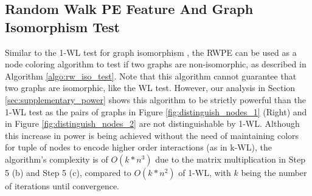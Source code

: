 \documentclass{article} \usepackage{iclr2021_conference,times}
\begin{document}
\subsection{Random Walk PE Feature And Graph Isomorphism Test}
\label{sec:supplementary_algo}


Similar to the 1-WL test for graph isomorphism \citep{weisfeiler1968reduction, morris2019weisfeiler, sato2020survey}, the RWPE can be used as a node coloring algorithm to test if two graphs are non-isomorphic, as described in Algorithm \ref{algo:rw_iso_test}. Note that this algorithm cannot guarantee that two graphs are isomorphic, like the WL test. However, our analysis in Section \ref{sec:supplementary_power} shows this algorithm to be strictly powerful than the 1-WL test as the pairs of graphs in Figure \ref{fig:distinguish_nodes_1} (Right) and in Figure \ref{fig:distinguish_nodes_2} are not distinguishable by 1-WL. Although this increase in power is being achieved without the need of maintaining colors for tuple of nodes to encode higher order interactions (as in k-WL), the algorithm's complexity is of $O(k * n^3)$ due to the matrix multiplication in Step 5 (b) and Step 5 (c), compared to $O(k * n^2)$ of 1-WL, with $k$ being the number of iterations until convergence.
\end{document}
